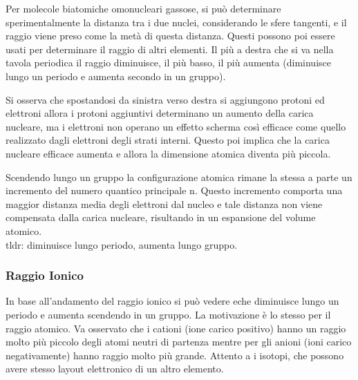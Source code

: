 \documentclass[a4paper]{article}
\begin{document}
Per molecole biatomiche omonucleari gassose, si può determinare sperimentalmente la distanza tra i due nuclei, considerando le sfere tangenti, e il raggio viene preso come la metà di questa distanza. Questi possono poi essere usati per determinare il raggio di altri elementi. Il più a destra che si va nella tavola periodica il raggio diminuisce, il più basso, il più aumenta (diminuisce lungo un periodo e aumenta secondo in un gruppo).

Si osserva che spostandosi da sinistra verso destra si aggiungono protoni ed elettroni allora i protoni aggiuntivi determinano un aumento della carica nucleare, ma i elettroni non operano un effetto scherma così efficace come quello realizzato dagli elettroni degli strati interni. Questo poi implica che la carica nucleare efficace aumenta e allora la dimensione atomica diventa più piccola.

Scendendo lungo un gruppo la configurazione atomica rimane la stessa a parte un incremento del numero quantico principale n. Questo incremento comporta una maggior distanza media degli elettroni dal nucleo e tale distanza non viene compensata dalla carica nucleare, risultando in un espansione del volume atomico. \\

tldr: diminuisce lungo periodo, aumenta lungo gruppo. 

\subsubsection{Raggio Ionico}
In base all'andamento del raggio ionico si può vedere eche diminuisce lungo un periodo e aumenta scendendo in un gruppo. La motivazione è lo stesso per il raggio atomico. Va osservato che i cationi (ione carico positivo) hanno un raggio molto più piccolo degli atomi neutri di partenza mentre per gli anioni (ioni carico negativamente) hanno raggio molto più grande. Attento a i isotopi, che possono avere stesso layout elettronico di un altro elemento. 
\end{document}
